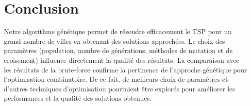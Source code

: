 \documentclass[a4paper,12pt]{article}
\begin{document}
\section{Conclusion}
Notre algorithme génétique permet de résoudre efficacement le TSP pour un grand nombre de villes en obtenant des solutions approchées. Le choix des paramètres (population, nombre de générations, méthodes de mutation et de croisement) influence directement la qualité des résultats. La comparaison avec les résultats de la brute-force confirme la pertinence de l’approche génétique pour l’optimisation combinatoire.
De ce fait, de meilleurs choix de paramètres et d'autres techniques d'optimisation pourraient être explorés pour améliorer les performances et la qualité des solutions obtenues.

\nocite{*} %
 

\end{document}
